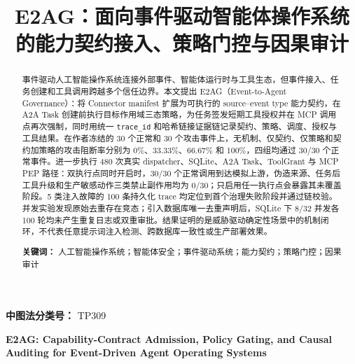 \documentclass[UTF8,zihao=5,fontset=none]{ctexart}
\title{\bfseries\zihao{-2} E2AG：面向事件驱动智能体操作系统的能力契约接入、策略门控与因果审计}
\author{}
\date{}
\begin{document}
\maketitle

\begin{abstract}
事件驱动人工智能操作系统连接外部事件、智能体运行时与工具生态，但事件接入、任务创建和工具调用跨越多个信任边界。本文提出 E2AG（Event-to-Agent Governance）：将 Connector manifest 扩展为可执行的 source--event type 能力契约，在 A2A Task 创建前执行目标作用域三态策略，为任务签发短期工具授权并在 MCP 调用点再次强制，同时用统一 \texttt{trace\_id} 和哈希链接证据链记录契约、策略、调度、授权与工具结果。在作者冻结的 30 个正常和 30 个攻击事件上，无机制、仅契约、仅策略和契约加策略的攻击阻断率分别为 0\%、33.33\%、66.67\% 和 100\%，四组均通过 30/30 个正常事件。进一步执行 480 次真实 dispatcher、SQLite、A2A Task、ToolGrant 与 MCP PEP 路径：双执行点同时开启时，30/30 个正常调用到达模拟上游，伪造来源、任务后工具升级和生产敏感动作三类禁止副作用均为 0/30；只启用任一执行点会暴露其未覆盖阶段。5 类注入故障的 100 条持久化 trace 均定位到首个治理失败阶段并通过链校验。并发实验发现原始去重存在竞态；引入数据库唯一去重声明后，SQLite 下 8/32 并发各 100 轮均未产生重复日志或双重审批。结果证明的是威胁驱动确定性场景中的机制闭环，不代表任意提示词注入检测、跨数据库一致性或生产部署效果。

\noindent\textbf{关键词：} 人工智能操作系统；智能体安全；事件驱动系统；能力契约；策略门控；因果审计
\end{abstract}

\noindent\textbf{中图法分类号：} TP309

\begin{center}
{\bfseries\large E2AG: Capability-Contract Admission, Policy Gating, and Causal Auditing for Event-Driven Agent Operating Systems}
\end{center}
\end{document}
